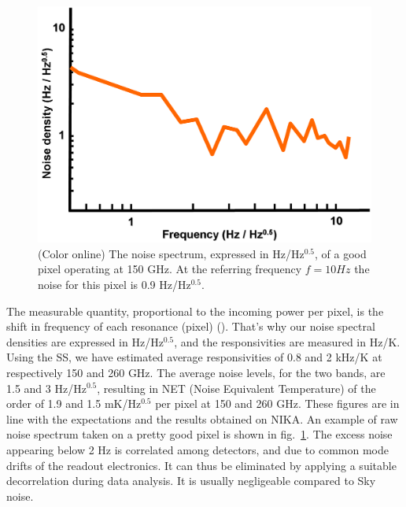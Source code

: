 \documentclass[]{aa} %
\begin{document}
\begin{figure}[h]
   \centering
    \includegraphics[width=.95\linewidth]{Fig3_noise.png}
    \caption{(Color online) The noise spectrum, expressed in Hz/Hz$^{0.5}$, of a good pixel operating at 150 GHz. At the referring frequency $f=10 Hz$ the noise for this pixel is 0.9 Hz/Hz$^{0.5}$.}
         \label{Fig3}
\end{figure}

The measurable quantity, proportional to the incoming power per pixel, is the shift in frequency of each resonance (pixel) (\cite{Swenson2010}). That's why our noise spectral densities are expressed in Hz/Hz$^{0.5}$, and the responsivities are measured in Hz/K. Using the SS, we have estimated average responsivities of 0.8 and 2 kHz/K at respectively 150 and 260 GHz. The average noise levels, for the two bands, are 1.5 and 3 Hz/Hz$^{0.5}$, resulting in NET (Noise Equivalent Temperature) of the order of 1.9 and 1.5 mK/Hz$^{0.5}$ per pixel at 150 and 260 GHz. These figures are in line with the expectations and the results obtained on NIKA. An example of raw noise spectrum taken on a pretty good pixel is shown in fig.~\ref{Fig3}. The excess noise appearing below 2 Hz is correlated among detectors, and due to common mode drifts of the readout electronics. It can thus be eliminated by applying a suitable decorrelation during data analysis. It is usually negligeable compared to Sky noise. 
\end{document}
